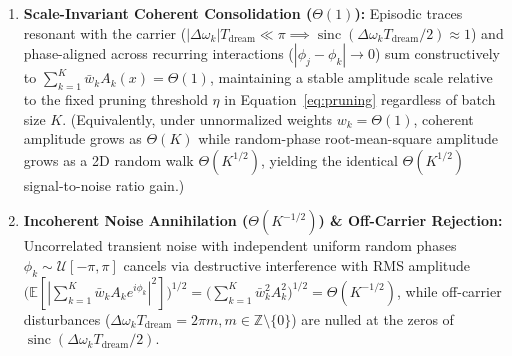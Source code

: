 \documentclass[10pt, twocolumn, a4paper]{article}
\begin{document}
\begin{enumerate}
    \item \textbf{Scale-Invariant Coherent Consolidation ($\Theta(1)$):} Episodic traces resonant with the carrier ($|\Delta\omega_k| T_{\text{dream}} \ll \pi \implies \operatorname{sinc}(\Delta\omega_k T_{\text{dream}}/2) \approx 1$) and phase-aligned across recurring interactions ($|\phi_j - \phi_k| \to 0$) sum constructively to $\sum_{k=1}^K \bar{w}_k A_k(x) = \Theta(1)$, maintaining a stable amplitude scale relative to the fixed pruning threshold $\eta$ in Equation~\eqref{eq:pruning} regardless of batch size $K$. (Equivalently, under unnormalized weights $w_k = \Theta(1)$, coherent amplitude grows as $\Theta(K)$ while random-phase root-mean-square amplitude grows as a 2D random walk $\Theta(K^{1/2})$, yielding the identical $\Theta(K^{1/2})$ signal-to-noise ratio gain.)
    \item \textbf{Incoherent Noise Annihilation ($\Theta(K^{-1/2})$) \& Off-Carrier Rejection:} Uncorrelated transient noise with independent uniform random phases $\phi_k \sim \mathcal{U}[-\pi, \pi]$ cancels via destructive interference with RMS amplitude $\big(\mathbb{E}[|\sum_{k=1}^K \bar{w}_k A_k e^{i\phi_k}|^2]\big)^{1/2} = \big(\sum_{k=1}^K \bar{w}_k^2 A_k^2\big)^{1/2} = \Theta(K^{-1/2})$, while off-carrier disturbances ($\Delta\omega_k T_{\text{dream}} = 2\pi m, m \in \mathbb{Z} \setminus \{0\}$) are nulled at the zeros of $\operatorname{sinc}(\Delta\omega_k T_{\text{dream}}/2)$.
\end{enumerate}
\end{document}
